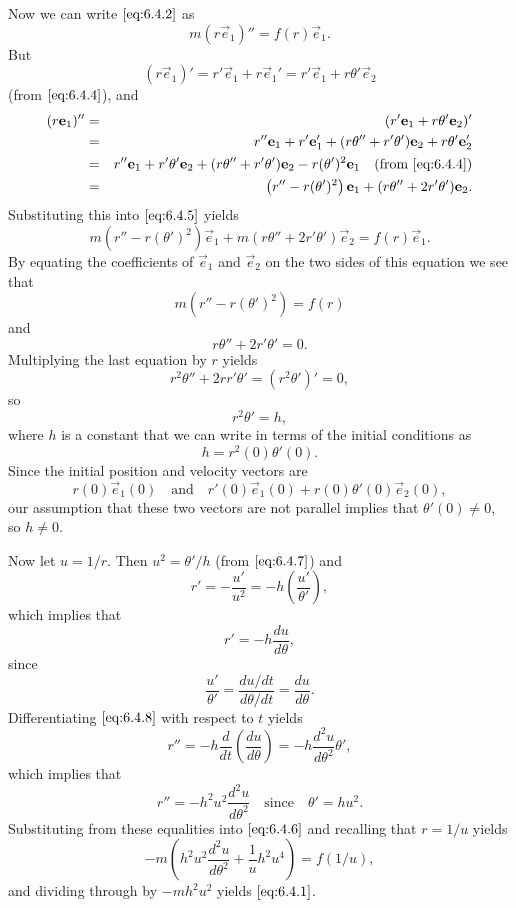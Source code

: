 \documentclass{ximera}
\begin{document}
Now we can write $\eqref{eq:6.4.2}$ as
\begin{equation} \label{eq:6.4.5}
m(r\vec{e}_1)''=f(r)\vec{e}_1.
\end{equation}
But
$$
(r\vec{e}_1)'=r'\vec{e}_1+r\vec{e}_1'=r'\vec{e}_1+r\theta'\vec{e}_2
$$
(from $\eqref{eq:6.4.4}$), and
\begin{eqnarray*}
(r\vec{e}_1)''&=&(r'\vec{e}_1+r\theta'\vec{e}_2)'\\
&=&r''\vec{e}_1+r'\vec{e}_1'+(r\theta''+r'\theta')\vec{e}_2
+r\theta'\vec{e}_2'\\
&=&r''\vec{e}_1+r'\theta'\vec{e}_2+(r\theta''+r'\theta')\vec{e}_2 -r(\theta')^2\vec{e}_1\quad\mbox{(from \eqref{eq:6.4.4})}\\
&=&\left(r''-r(\theta')^2\right)\vec{e}_1+(r\theta''+2r'\theta')\vec{e}_2.
\end{eqnarray*}
Substituting this into $\eqref{eq:6.4.5}$ yields
$$
m\left(r''-r(\theta')^2\right)\vec{e}_1+m(r\theta''+2r'\theta')\vec{e}_2=f(r)\vec{e}_1.
$$
By equating the coefficients of $\vec{e}_1$ and $\vec{e}_2$ on the
two sides of this equation we see that
\begin{equation} \label{eq:6.4.6}
m\left(r''-r(\theta')^2\right)=f(r)
\end{equation}
and
$$
r\theta''+2r'\theta'=0.
$$
Multiplying the last equation by $r$ yields
$$
r^2\theta''+2rr'\theta'=(r^2\theta')'=0,
$$
so
\begin{equation} \label{eq:6.4.7}
r^2\theta'=h,
\end{equation}
where $h$ is a constant that we can write in terms of the initial
conditions as
$$
h=r^2(0)\theta'(0).
$$
Since the initial position and velocity vectors are
$$
 r(0)\vec{e}_1(0)\quad\mbox{and}\quad
r'(0)\vec{e}_1(0)+r(0)\theta'(0)\vec{e}_2(0),
$$
our assumption that these two vectors are not parallel implies that
$\theta'(0)\neq 0$, so $h\neq 0$.

Now let $u=1/r$.
Then  $u^2=\theta'/h$ (from $\eqref{eq:6.4.7}$) and
$$
r'=-\frac{u'}{u^2}=-h\left(\frac{u'}{\theta'}\right),
$$
which implies that
\begin{equation} \label{eq:6.4.8}
r'=-h\frac{du}{d\theta},
\end{equation}
since
$$
\frac{u'}{\theta'}=\frac{du/dt}{d\theta/dt}=\frac{du}{d\theta}.
$$
Differentiating $\eqref{eq:6.4.8}$ with respect to $t$ yields
$$
r''=-h\frac{d}{dt}\left(\frac{du}{d\theta}\right)
=-h\frac{d^2u}{d\theta^2}\theta',
$$
which implies that
$$
r''=-h^2u^2\frac{d^2u}{d\theta^2}
\quad\mbox{since}\quad \theta'=hu^2.
$$
Substituting from these equalities into
$\eqref{eq:6.4.6}$ and recalling that $r=1/u$ yields
$$
-m\left(h^2u^2\frac{d^2u}{d\theta^2}+\frac{1}{u}h^2u^4\right)
=f(1/u),
$$
and dividing through by $-mh^2u^2$ yields $\eqref{eq:6.4.1}$.
\end{document}
